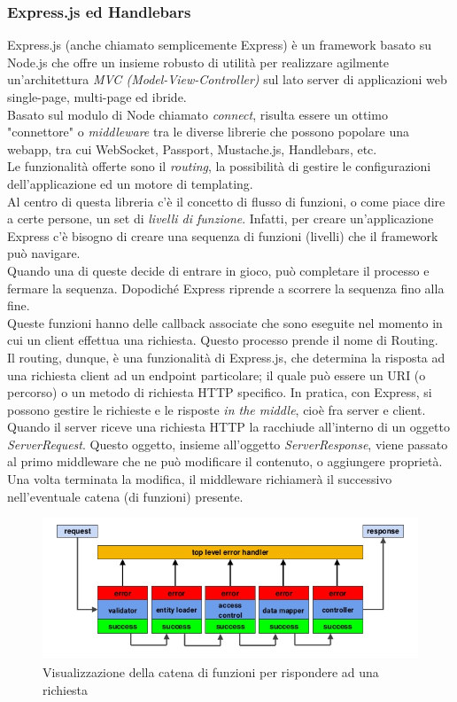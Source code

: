 \subsubsection{Express.js ed Handlebars}
\label{sec:express handlebars}
Express.js (anche chiamato semplicemente Express) è un framework basato su Node.js che offre un insieme robusto di utilità per realizzare agilmente un'architettura \textit{MVC (Model-View-Controller)} sul lato server di applicazioni web single-page, multi-page ed ibride.
\\Basato sul modulo di Node chiamato \textit{connect}, risulta essere un ottimo "connettore" o \textit{middleware} tra le diverse librerie che possono popolare una webapp, tra cui WebSocket, Passport, Mustache.js, Handlebars, etc.
\\Le funzionalità offerte sono il \textit{routing}, la possibilità di gestire le configurazioni dell'applicazione ed un motore di templating.
\\Al centro di questa libreria c'è il concetto di flusso di funzioni, o come piace dire a certe persone, un set di \textit{livelli di funzione}. Infatti, per creare un'applicazione Express c'è bisogno di creare una sequenza di funzioni (livelli) che il framework può navigare. 
\\Quando una di queste decide di entrare in gioco, può completare il processo e fermare la sequenza. Dopodiché Express riprende a scorrere la sequenza fino alla fine.
\\Queste funzioni hanno delle callback associate che sono eseguite nel momento in cui un client effettua una richiesta. Questo processo prende il nome di Routing.
\\Il routing, dunque, è una funzionalità di Express.js, che determina la risposta ad una richiesta client ad un endpoint particolare; il quale può essere un URI (o percorso) o un metodo di richiesta HTTP specifico. In pratica, con Express, si possono gestire le richieste e le risposte \textit{in the middle}, cioè fra server e client. Quando il server riceve una richiesta HTTP la racchiude all'interno di un oggetto \textit{ServerRequest}. Questo oggetto, insieme all'oggetto \textit{ServerResponse}, viene passato al primo middleware che ne può modificare il contenuto, o aggiungere proprietà. Una volta terminata la modifica, il middleware richiamerà il successivo nell'eventuale catena (di funzioni) presente.
\begin{figure}[H]
	\centering
	\includegraphics[width=\textwidth]{images/ExpressRoute.png}
	\caption{Visualizzazione della catena di funzioni per rispondere ad una richiesta}
	\label{fig:expressFlow}
\end{figure}
